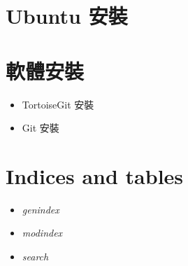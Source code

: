\documentclass[letterpaper,10pt,english]{sphinxmanual}
\begin{document}
\chapter{Ubuntu 安裝}
\label{_doc/ubuntu/index::doc}\label{_doc/ubuntu/index:ubuntu}

\chapter{軟體安裝}
\label{_doc/software/index::doc}\label{_doc/software/index:id1}\begin{itemize}
\item {} 
TortoiseGit 安裝

\item {} 
Git 安裝

\end{itemize}


\chapter{Indices and tables}
\label{index:indices-and-tables}\begin{itemize}
\item {} 
\emph{genindex}

\item {} 
\emph{modindex}

\item {} 
\emph{search}

\end{itemize}



\renewcommand{\indexname}{Index}
\printindex
\end{document}
